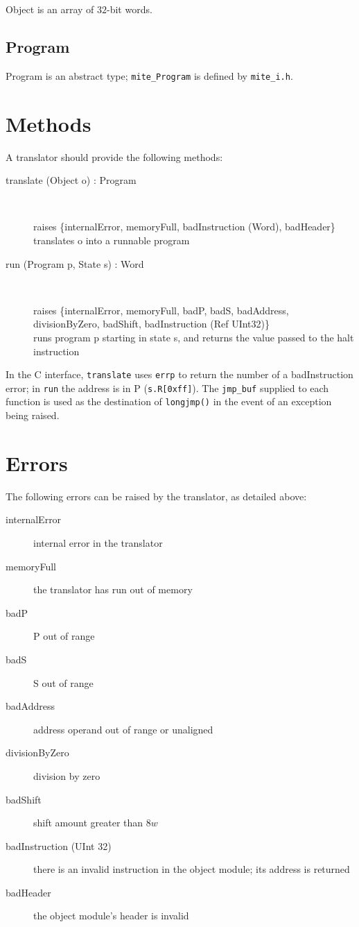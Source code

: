 \documentclass[english]{scrartcl}
\newcommand{\absfont}{\sffamily}
\newcommand{\abs}[1]{{\absfont #1}}
\begin{document}
\abs{Object} is an array of $32$-bit words.


\subsection{Program}

\abs{Program} is an abstract type; \verb|mite_Program| is defined by
\verb|mite_i.h|.



\section{Methods} \label{methods}

A translator should provide the following methods:

\begin{description}
\item[\abs{translate (Object o) : Program}]\ \\\raggedright\abs{raises
\{internalError, memoryFull, badInstruction (Word),
badHeader\}}\\translates \abs{o} into a runnable program
\item[\abs{run (Program p, State s) : Word}]\
\\\raggedright\abs{raises \{internalError, memoryFull, badP, badS,
badAddress, divisionByZero, badShift, badInstruction (Ref
UInt32)\}}\\runs program \abs{p} starting in state \abs{s}, and
returns the value passed to the \abs{halt} instruction
\end{description}

In the C interface, \verb|translate| uses \verb|errp| to return the number of a
\abs{badInstruction} error; in \verb|run| the address is in \abs{P}
(\verb|s.R[0xff]|). The \verb|jmp_buf| supplied to each function is used as the
destination of \verb|longjmp()| in the event of an exception being raised.



\section{Errors}

The following errors can be raised by the translator, as detailed above:

\begin{description}
\item[\abs{internalError}]internal error in the translator
\item[\abs{memoryFull}]the translator has run out of memory
\item[\abs{badP}]\abs{P} out of range
\item[\abs{badS}]\abs{S} out of range
\item[\abs{badAddress}]address operand out of range or unaligned
\item[\abs{divisionByZero}]division by zero
\item[\abs{badShift}]shift amount greater than $8w$
\item[\abs{badInstruction (UInt 32)}]there is an invalid instruction
in the object module; its address is returned
\item[\abs{badHeader}]the object module's header is invalid
\end{description}
\end{document}
